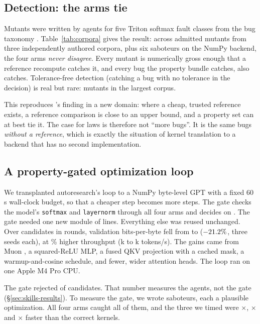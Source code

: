 \subsection{Detection: the arms tie}
\label{sec:detection}

Mutants were written by agents for five Triton softmax fault classes from the bug
taxonomy \citep{rathnasuriya2026tile}. Table~\ref{tab:corpora} gives the result: across
\mutantsAdmitted{} admitted mutants from three independently authored corpora, plus six
saboteurs on the NumPy backend, the four arms \emph{never disagree}. Every mutant is
numerically gross enough that a reference recompute catches it, and every bug the
property bundle catches, \allclose also catches. Tolerance-free detection (catching a
bug with no tolerance in the decision) is real but rare: \grownTolFree{} mutants in
the largest corpus.

This reproduces \citeauthor{hughes2020specify}'s finding in a new domain: where a cheap,
trusted reference exists, a reference comparison is close to an upper bound, and a
property set can at best tie it. The case for laws is therefore not ``more bugs''. It is
the same bugs \emph{without a reference}, which is exactly the situation of kernel
translation to a backend that has no second implementation.

\subsection{A property-gated optimization loop}
\label{sec:loop}

We transplanted autoresearch's loop \citep{karpathy2026autoresearch} to a NumPy
byte-level GPT with a fixed 60\,s wall-clock budget, so that a cheaper step becomes more
steps. The gate checks the model's \texttt{softmax} and \texttt{layernorm} through all
four arms and decides on \DeclArm. The gate needed one new module of
\loopGateLines{} lines. Everything else was reused unchanged. Over \loopCandidates{}
candidates in \loopRounds{} rounds, validation bits-per-byte fell from \loopBpbBase{} to
\loopBpbBest{} ($-21.2\%$, three seeds each), at \loopTputGain\% higher
throughput (\loopTputBase{}k to \loopTputBest{}k tokens/s). The gains came from Muon
\citep{jordan2024muon}, a squared-ReLU MLP, a fused QKV projection with a cached mask,
a warmup-and-cosine schedule, and fewer, wider attention heads. The loop ran on one
Apple M4 Pro CPU.

The gate rejected \loopRejections{} of \loopCandidates{} candidates. That number measures
the agents, not the gate (\S\ref{sec:skills-results}). To measure the gate, we wrote
\sabCount{} saboteurs, each a plausible optimization. All four arms caught all of them,
and the three we timed were \sabSpeedNoMax$\times$, \sabSpeedNoCenter$\times$ and
\sabSpeedNoDivide$\times$ faster than the correct kernels.

